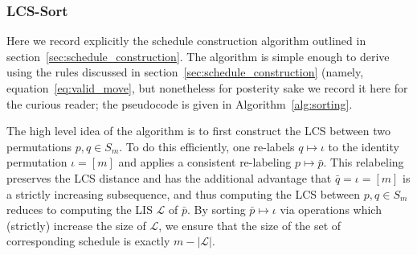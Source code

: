 \documentclass[sn-mathphys]{sn-jnl}
\begin{document}
\subsubsection{LCS-Sort}
Here we record explicitly the schedule construction algorithm outlined in section~\ref{sec:schedule_construction}. The algorithm is simple enough to derive using the rules discussed in section~\ref{sec:schedule_construction} (namely, equation~\eqref{eq:valid_move}, but nonetheless for posterity sake we record it here for the curious reader; the pseudocode is given in Algorithm~\ref{alg:sorting}.

The high level idea of the algorithm is to first construct the LCS between two permutations $p,q \in S_m$. To do this efficiently, one re-labels $q \mapsto \iota$ to the identity permutation $\iota = [m]$ and applies a consistent re-labeling $p \mapsto \bar{p}$. This relabeling preserves the LCS distance and has the additional advantage that $\bar{q} = \iota = [m]$ is a strictly increasing subsequence, and thus computing the LCS between $p,q \in S_m$ reduces to computing the LIS $\mathcal{L}$ of $\bar{p}$. 
By sorting $\bar{p} \mapsto \iota$ via operations which (strictly) increase the size of $\mathcal{L}$, we ensure that the size of the set of corresponding schedule is exactly $m - \lvert \mathcal{L} \rvert$. 
\end{document}
